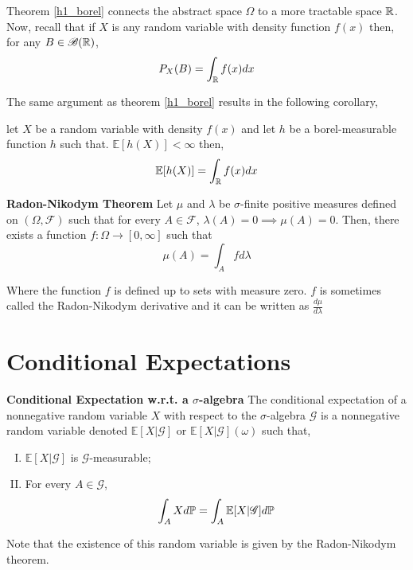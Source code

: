 \documentclass[../TGMAFFIRO.tex]{subfiles}
\begin{document}
Theorem \ref{h1_borel} connects the abstract space $\Omega$ to a more tractable space $\mathbb{R}$.\\

Now, recall that if $X$ is any random variable with density function $f(x)$ then, for any $B \in \mathscr{B}(\mathbb{R})$,
\begin{equation*}
	P_X(B) = \int_{\mathbb{R}} f(x) dx
\end{equation*}

The same argument as theorem \ref{h1_borel} results in the following corollary,
\begin{corollary}
	let $X$ be a random variable with density $f(x)$ and let $h$ be a borel-measurable function $h$ such that. $\mathbb{E}[h(X)] < \infty$ then,
	\begin{equation}
		\mathbb{E}[h(X)] = \int_{\mathbb{R}} f(x) dx
	\end{equation}
\end{corollary}

\begin{theorem}\textbf{Radon-Nikodym Theorem}
Let $\mu$ and $\lambda$ be $\sigma$-finite positive measures defined on $(\Omega, \mathscr{F})$ such that for every $A \in \mathscr{F}$, $\lambda(A) = 0 \implies \mu(A)= 0$. Then, there exists a function $f: \Omega \to [0, \infty]$ such that
\[
	\mu(A) = \int_A f d\lambda
\]

Where the function $f$ is defined up to sets with measure zero. $f$ is sometimes called the Radon-Nikodym derivative and it can be written as $\frac{d\mu}{d\lambda}$
\end{theorem}

\section{Conditional Expectations}

\begin{definition}\textbf{Conditional Expectation w.r.t. a $\sigma$-algebra}
The conditional expectation of a nonnegative random variable $X$ with respect to the $\sigma$-algebra $\mathscr{G}$ is a nonnegative random variable denoted $\mathbb{E}[X | \mathscr{G}]$ or $\mathbb{E}[X | \mathscr{G}](\omega)$ such that,
\begin{enumerate}[I.]
	\item $\mathbb{E}[X | \mathscr{G}]$ is $\mathscr{G}$-measurable;
	\item For every $A \in \mathscr{G}$,
	\[\int_A X d\mathbb{P} = \int_A \mathbb{E}[X | \mathscr{G}] d\mathbb{P} \]
\end{enumerate}

\end{definition}
Note that the existence of this random variable is given by the Radon-Nikodym theorem.
\end{document}
